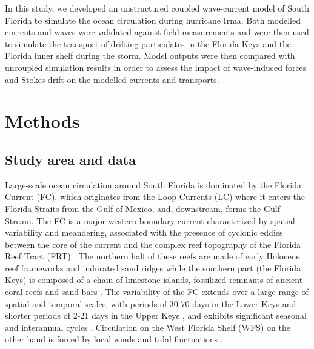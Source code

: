 \documentclass[11pt,a4paper]{article}
\begin{document}
In this study, we developed an unstructured coupled wave-current model of South Florida to simulate the ocean circulation during hurricane Irma. Both modelled currents and waves were validated against field measurements and were then used to simulate the transport of drifting particulates in the Florida Keys and the Florida inner shelf during the storm. Model outputs were then compared with uncoupled simulation results in order to assess the impact of wave-induced forces and Stokes drift on the modelled currents and transports.

\section{Methods}
\subsection{Study area and data}
Large-scale ocean circulation around South Florida is dominated by the Florida Current (FC), which originates from the Loop Currents (LC) where it enters the Florida Straits from the Gulf of Mexico, and, downstream, forms the Gulf Stream. The FC is a major western boundary current characterized by spatial variability and meandering, associated with the presence of cyclonic eddies between the core of the current and the complex reef topography of the Florida Reef Tract (FRT) \citep{frys2020fine,lee1995florida,kourafalou2012florida}. The northern half of these reefs are made of early Holocene reef frameworks and indurated sand ridges while the southern part (the Florida Keys) is composed of a chain of limestone islands, fossilized remnants of ancient coral reefs and sand bars \citep{hoffmeister1968geology,shinn1988geology,lidz1991paleoshorelines}. The variability of the FC extends over a large range of spatial and temporal scales, with periods of 30-70 days in the Lower Keys \citep{lee1995florida} and shorter periods of 2-21 days in the Upper Keys \citep{lee1977low}, and exhibits significant seasonal and interannual cycles \citep{johns1987meandering, lee1988wind,schott1988variability}. Circulation on the West Florida Shelf (WFS) on the other hand is forced by local winds and tidal fluctuations \citep{lee2002volume,liu2012seasonal}.
\end{document}
